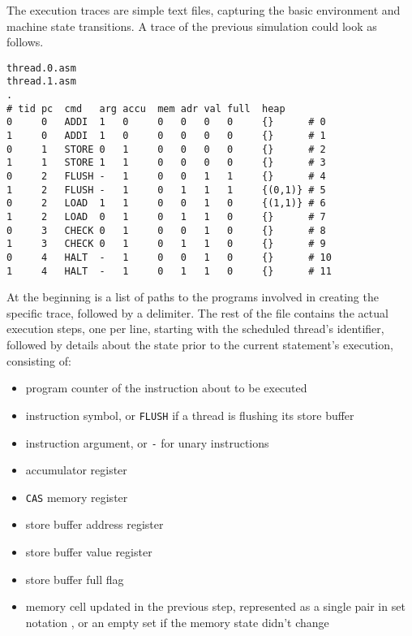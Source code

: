 The execution traces are simple text files, capturing the basic environment and machine state transitions.
A trace of the previous simulation could look as follows.

\begin{lstlisting}[language={[concubine]Assembler}, caption={Simple Output Trace}, label={lst:trace:simple}, xleftmargin=\parindent]
thread.0.asm
thread.1.asm
.
# tid pc  cmd   arg accu  mem adr val full  heap
0     0   ADDI  1   0     0   0   0   0     {}      # 0
1     0   ADDI  1   0     0   0   0   0     {}      # 1
0     1   STORE 0   1     0   0   0   0     {}      # 2
1     1   STORE 1   1     0   0   0   0     {}      # 3
0     2   FLUSH -   1     0   0   1   1     {}      # 4
1     2   FLUSH -   1     0   1   1   1     {(0,1)} # 5
0     2   LOAD  1   1     0   0   1   0     {(1,1)} # 6
1     2   LOAD  0   1     0   1   1   0     {}      # 7
0     3   CHECK 0   1     0   0   1   0     {}      # 8
1     3   CHECK 0   1     0   1   1   0     {}      # 9
0     4   HALT  -   1     0   0   1   0     {}      # 10
1     4   HALT  -   1     0   1   1   0     {}      # 11
\end{lstlisting}

At the beginning is a list of paths to the programs involved in creating the specific trace, followed by a delimiter.
The rest of the file contains the actual execution steps, one per line, starting with the scheduled thread's identifier, followed by details about the state prior to the current statement's execution, consisting of:

\begin{itemize}
  \item program counter of the instruction about to be executed
  \item instruction symbol, or \lstinline[language={[concubine]Assembler}]{FLUSH} if a thread is flushing its store buffer
  \item instruction argument, or \texttt{-} for unary instructions
  \item accumulator register
  \item \lstinline[language={[concubine]Assembler}]{CAS} memory register
  \item store buffer address register
  \item store buffer value register
  \item store buffer full flag
  \item memory cell updated in the previous step, represented as a single pair in set notation \texttt{}, or an empty set \texttt{\string{\string}} if the memory state didn't change
\end{itemize}

